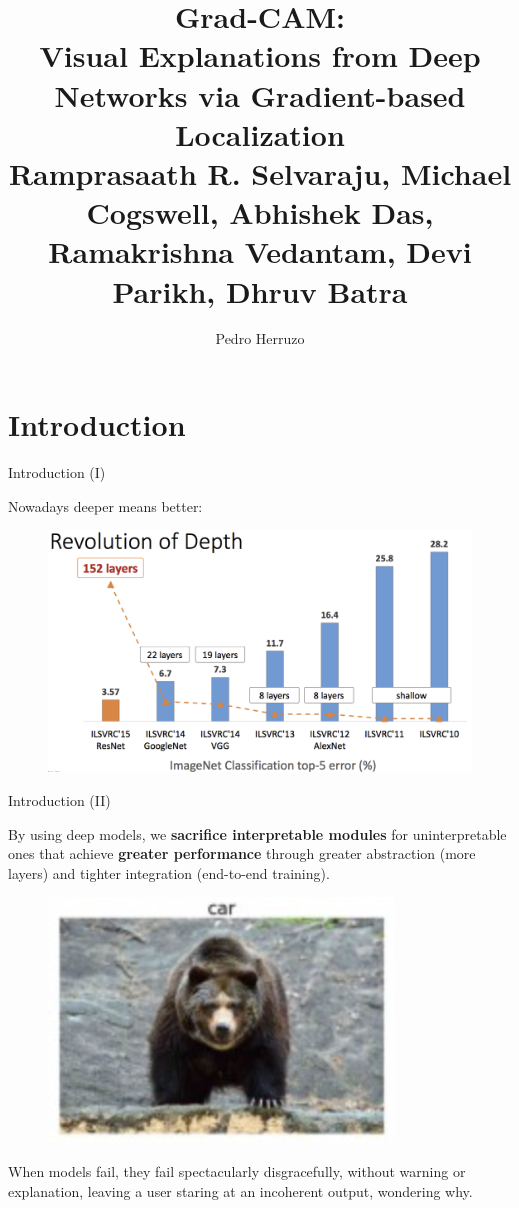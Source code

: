 \documentclass[11pt]{beamer}
\author[P.Herruzo]{Pedro Herruzo}
\title[Master thesis]{\textbf{Grad-CAM}:\\
\textbf{Visual Explanations from Deep Networks via Gradient-based Localization } \\
Ramprasaath R. Selvaraju, Michael Cogswell, Abhishek Das, Ramakrishna Vedantam, Devi Parikh, Dhruv Batra}
\begin{document}
\begin{frame}
\titlepage
\end{frame}

\begin{frame}
\tableofcontents
\end{frame}

\section{Introduction}
\begin{frame}{Introduction (I)}

Nowadays deeper means better:

\begin{figure}
    \includegraphics[width=1.05\textwidth]{deep_revolution.png}
\end{figure}

\end{frame}

\begin{frame}{Introduction (II)}

By using deep models, we \textbf{sacrifice interpretable modules} for uninterpretable ones that achieve \textbf{greater performance} through greater abstraction (more layers) and tighter integration (end-to-end training).

\begin{figure}
    \includegraphics[width=.5\textwidth]{car.png}
\end{figure}

When models fail, they fail spectacularly disgracefully, without warning or explanation, leaving a user staring at an incoherent output, wondering why.

\end{frame}
\end{document}
